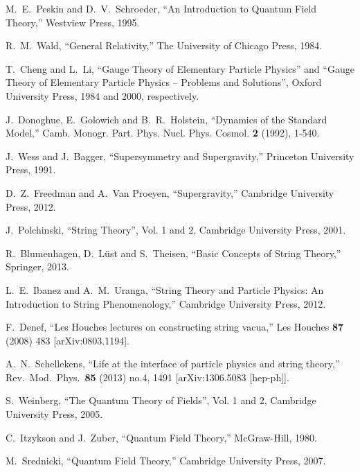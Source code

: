 \documentclass[12pt]{article}
\numberwithin{equation}{section}
\begin{document}
\begin{thebibliography}{999}

M.~E.~Peskin and D.~V.~Schroeder, ``An Introduction to Quantum Field Theory,'' Westview Press, 1995.

R.~M.~Wald, ``General Relativity,'' The University of Chicago Press, 1984.

T.~Cheng and L.~Li, ``Gauge Theory of Elementary Particle Physics'' and ``Gauge Theory of Elementary Particle Physics -- Problems and Solutions'', Oxford University Press, 1984 and 2000, respectively.

J.~Donoghue, E.~Golowich and B.~R.~Holstein,
``Dynamics of the Standard Model,''
Camb. Monogr. Part. Phys. Nucl. Phys. Cosmol. \textbf{2} (1992), 1-540.

J.~Wess and J.~Bagger, ``Supersymmetry and Supergravity,'' Princeton University Press, 1991.

D.~Z.~Freedman and A.~Van Proeyen, ``Supergravity,'' Cambridge University Press, 2012.

J.~Polchinski, ``String Theory'', Vol. 1 and 2, Cambridge University Press, 2001.

R.~Blumenhagen, D.~L\"ust and S.~Theisen,
``Basic Concepts of String Theory,'' Springer, 2013.

L.~E.~Ibanez and A.~M.~Uranga,
``String Theory and Particle Physics: An Introduction to String Phenomenology,'' Cambridge University Press, 2012.

  F.~Denef, ``Les Houches lectures on constructing string vacua,'' Les Houches {\bf 87} (2008) 483 [arXiv:0803.1194]. 
  
  A.~N.~Schellekens,
  ``Life at the interface of particle physics and string theory,''
  Rev.\ Mod.\ Phys.\  {\bf 85} (2013) no.4,  1491
  [arXiv:1306.5083 [hep-ph]].

S.~Weinberg, ``The Quantum Theory of Fields'', Vol. 1 and 2, Cambridge University Press, 2005.

C.~Itzykson and J.~Zuber, ``Quantum Field Theory,''  McGraw-Hill, 1980.

M.~Srednicki, ``Quantum Field Theory,'' Cambridge University Press, 2007.


\end{thebibliography}
\end{document}
